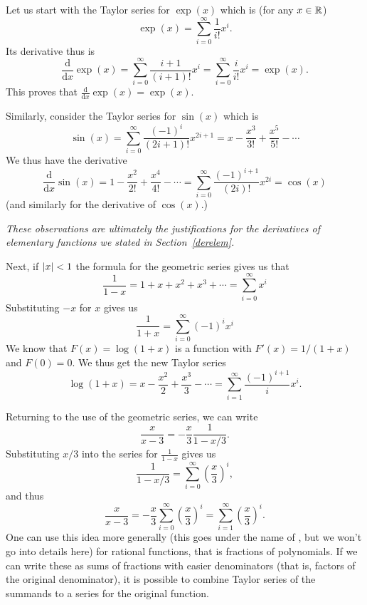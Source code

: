 Let us start with the Taylor series for $\exp(x)$ which is (for any
$x\in{\mathbb R}$)
\[
\exp(x)=\sum_{i=0}^\infty \frac{1}{i!} x^i.
\]
Its derivative thus is
\[
\frac{\mbox{d}}{\mbox{d}x}
\exp(x)=\sum_{i=0}^\infty \frac{i+1}{(i+1)!} x^i
=\sum_{i=0}^\infty \frac{i}{i!} x^i=\exp(x).
\]
This proves that $\frac{\mbox{d}}{\mbox{d}x}\exp(x)=\exp(x)$.
\smallskip

Similarly, consider the Taylor series for $\sin(x)$ which is
\[
\sin(x)=\sum_{i=0}^\infty
\frac{(-1)^i}{(2i+1)!}x^{2i+1}=x-\frac{x^3}{3!}+\frac{x^5}{5!}-\cdots
\]
We thus have the derivative
\[
\frac{\mbox{d}}{\mbox{d}x}
\sin(x)=
1-\frac{x^2}{2!}+\frac{x^4}{4!}-\cdots
=\sum_{i=0}^\infty \frac{(-1)^{i+1}}{(2i)!}x^{2i}=\cos(x)
\]
(and similarly for the derivative of $\cos(x)$.)

{\em These observations are ultimately the
justifications for the derivatives of elementary functions we stated in
Section~\ref{derelem}.}
\smallskip

Next, if $\left|x\right|<1$ the formula for the geometric series gives us that
\[
\frac{1}{1-x}=1+x+x^2+x^3+\cdots=\sum_{i=0}^\infty x^i
\]
Substituting $-x$ for $x$ gives us
\[
\frac{1}{1+x}=\sum_{i=0}^\infty (-1)^i x^i
\]
We know that $F(x)=\log(1+x)$ is a function with $F'(x)=1/(1+x)$ and
$F(0)=0$. We thus get the new Taylor series
\[
\log(1+x)=x-\frac{x^2}{2}+\frac{x^3}{3}-\cdots=\sum_{i=1}^\infty\frac{(-1)^{i+1}}{i}x^i.
\]
\smallskip

Returning to the use of the geometric series, we can write
\[
\frac{x}{x-3}=-\frac{x}{3}\frac{1}{1-x/3}.
\]
Substituting $x/3$ into the series for $\frac{1}{1-x}$ gives us
\[
\frac{1}{1-x/3}=\sum_{i=0}^\infty \left(\frac{x}{3}\right)^i,
\]
and thus
\[
\frac{x}{x-3}= -\frac{x}{3}\sum_{i=0}^\infty \left(\frac{x}{3}\right)^i
= \sum_{i=1}^\infty \left(\frac{x}{3}\right)^i.
\]
One can use this idea more generally (this goes under the name of
, but we won't go into details here) for rational
functions, that is fractions of polynomials. If we can write these as sums
of fractions with easier denominators (that is, factors of the original
denominator), it is possible to combine Taylor series of the summands to a
series for the original function.

